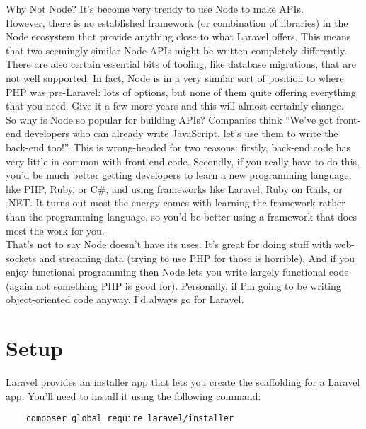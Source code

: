 \begin{infobox}{Why Not Node?}
    It's become very trendy to use Node to make APIs.
    \\

    However, there is no established framework (or combination of libraries) in the Node ecosystem that provide anything close to what Laravel offers. This means that two seemingly similar Node APIs might be written completely differently. There are also certain essential bits of tooling, like database migrations, that are not well supported. In fact, Node is in a very similar sort of position to where PHP was pre-Laravel: lots of options, but none of them quite offering everything that you need. Give it a few more years and this will almost certainly change.
    \\

    So why is Node so popular for building APIs? Companies think ``We've got front-end developers who can already write JavaScript, let's use them to write the back-end too!''. This is wrong-headed for two reasons: firstly, back-end code has very little in common with front-end code. Secondly, if you really have to do this, you'd be much better getting developers to learn a new programming language, like PHP, Ruby, or C\#, and using frameworks like Laravel, Ruby on Rails, or .NET. It turns out most the energy comes with learning the framework rather than the programming language, so you'd be better using a framework that does most the work for you.
    \\

    That's not to say Node doesn't have its uses. It's great for doing stuff with web-sockets and streaming data (trying to use PHP for those is horrible). And if you enjoy functional programming then Node lets you write largely functional code (again not something PHP is good for). Personally, if I'm going to be writing object-oriented code anyway, I'd always go for Laravel.
\end{infobox}


\section{Setup}

Laravel provides an installer app that lets you create the scaffolding for a Laravel app. You'll need to install it using the following command:

\begin{verbatim}
    composer global require laravel/installer
\end{verbatim}

